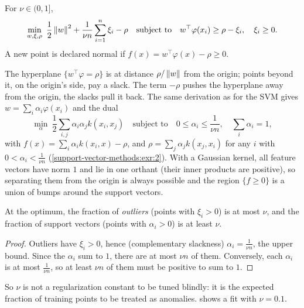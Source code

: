 \begin{notechapter}
\begin{definition}
For $\nu\in(0, 1]$,
\[
  \min_{w, \xi, \rho}\ \frac12\left\|w\right\|^2 + \frac1{\nu n}\sum_{i=1}^n\xi_i - \rho\quad\text{subject to}\quad
  w^\top\varphi(x_i)\geq\rho - \xi_i,\quad\xi_i\geq0 .
\]
A new point is declared normal if $f(x) = w^\top\varphi(x) - \rho\geq0$.
\end{definition}

The hyperplane $\{w^\top\varphi = \rho\}$ is at distance $\rho/\left\|w\right\|$ from the origin; points beyond it, on the
origin's side, pay a slack. The term $-\rho$ pushes the hyperplane away from the origin,
the slacks pull it back. The same derivation as for the SVM gives $w = \sum_i\alpha_i\varphi(x_i)$ and the
dual
\[
  \min_\alpha\ \frac12\sum_{i,j}\alpha_i\alpha_jk(x_i, x_j)\quad\text{subject to}\quad0\leq\alpha_i\leq\frac1{\nu n},\quad\sum_i\alpha_i = 1,
\]
with $f(x) = \sum_i\alpha_ik(x_i, x) - \rho$, and $\rho = \sum_j\alpha_jk(x_j, x_i)$ for any $i$ with $0<\alpha_i<\frac1{\nu n}$
(\cref{support-vector-methods:exr:2}). With a Gaussian kernel, all feature vectors have
norm $1$ and lie in one orthant (their inner products are positive), so separating them
from the origin is always possible and the region $\{f\geq0\}$ is a union of bumps around the
support vectors.

\begin{proposition}\label{support-vector-methods:prop:nu}
At the optimum, the fraction of \emph{outliers} (points with $\xi_i>0$) is at most $\nu$, and the fraction
of support vectors (points with $\alpha_i>0$) is at least $\nu$.
\end{proposition}

\begin{proof}
Outliers have $\xi_i>0$, hence (complementary slackness) $\alpha_i = \frac1{\nu n}$, the upper bound. Since the
$\alpha_i$ sum to $1$, there are at most $\nu n$ of them. Conversely, each $\alpha_i$ is at most $\frac1{\nu n}$, so at least
$\nu n$ of them must be positive to sum to $1$.
\end{proof}

So $\nu$ is not a regularization constant to be tuned blindly: it is the expected fraction of
training points to be treated as anomalies.  shows a
fit with $\nu = 0.1$.


\end{notechapter}
